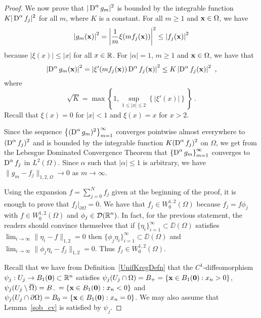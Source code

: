 \begin{proof}
We now prove that $\displaystyle |\operatorname{D}^\alpha g_m|^2$ is bounded by
the integrable function $\displaystyle K |\operatorname{D}^\alpha f_j|^2$ for all
$m$, where $K$ is a constant.  For all $m \geq 1$ and
$\mathbf{x} \in \Omega$, we have
\[
\left| g_m(\mathbf{x}) \right|^2 =
\left| \frac{1}{m} \xi(mf_j(\mathbf{x})) \right|^2
\leq \left| f_j(\mathbf{x}) \right|^2
\]
because $|\xi(x)|\leq |x|$ for all $x \in \mathbb{R}$.  For $|\alpha|=1$,
$m \geq 1$ and $\mathbf{x}\in \Omega$, we have that
\[
\left| \operatorname{D}^\alpha g_m(\mathbf{x}) \right|^2 =
\left| \xi'(mf_j(\mathbf{x})) \operatorname{D}^\alpha f_j(\mathbf{x}) \right|^2
\leq K \left| \operatorname{D}^\alpha f_j(\mathbf{x}) \right|^2 \ ,
\]
where
\[
\sqrt{K} = \max \left\{ 1,
\sup_{1\leq |x|\leq 2} \left\{ |\xi'(x)| \right\} \right\} \ .
\]
Recall that $\xi(x) =0$ for $|x|<1$ and $\xi(x) = x$ for $x>2$.

Since the sequence
$\displaystyle \left\{ (\operatorname{D}^\alpha g_m)^2 \right\}_{m=1}^\infty$ converges
pointwise almost everywhere to $\displaystyle (\operatorname{D}^\alpha f_j)^2$
and is bounded by the integrable function
$\displaystyle K (\operatorname{D}^\alpha f_j)^2$ on $\Omega$, we get from
the Lebesgue Dominated Convergence Theorem that
$\displaystyle \left\{ \operatorname{D}^\alpha g_m \right\}_{m=1}^\infty$ converges
to $\displaystyle \operatorname{D}^\alpha f_j$ in $\displaystyle L^2(\Omega)$.
Since $\alpha$ such that $|\alpha|\leq 1$ is arbitrary, we have
$\|g_m - f_j\|_{1,2,\Omega} \rightarrow 0$ as $m\rightarrow \infty$.

\stage{$\mathbf{\Rightarrow}$}
Using the expansion
$\displaystyle f = \sum_{j=0}^N f_j$ given at the beginning of the proof, it
is enough to prove that $\displaystyle f_j \big|_{\partial \Omega} = 0$.
We have that 
$\displaystyle f_j \in W^{1,2}_0(\Omega)$ because $f_j = f \phi_j$ with
$\displaystyle f \in W^{1,2}_0(\Omega)$ and
$\displaystyle \phi_j \in \mathcal{D}(\mathbb{R}^n)$.  In fact, for the previous
statement, the readers should convince themselves that if
$\displaystyle \{ \eta_i \}_{i=1}^\infty \subset \DD(\Omega)$
satisfies $\displaystyle \lim_{i\rightarrow \infty} \|\eta_i -f \|_{1,2} = 0$
then
$\displaystyle \{ \phi_j \eta_i \}_{i=1}^\infty \subset \DD(\Omega)$
and
$\displaystyle \lim_{i\rightarrow \infty} \|\phi_j \eta_i -f_j \|_{1,2} = 0$.
Thus $\displaystyle f_j \in W^{1,2}_0(\Omega)$.

Recall that we have from Definition~\ref{UnifKregDefn} that
the $\displaystyle C^1$-diffeomorphism
$\psi_j : U_j \to B_1(\mathbf{0}) \subset \mathbb{R}^n$
satisfies $\psi_j(U_j\cap \Omega) = B_+
= \left\{ \mathbf{x}\in B_1(\mathbf{0}) : x_n>0 \right\}$,
$\psi_j(U_j \setminus \overline{\Omega}) = B_-
= \left\{ \mathbf{x}\in B_1(\mathbf{0}) : x_n<0 \right\}$
and $\psi_j(U_j\cap \partial \Omega) = B_0
= \left\{ \mathbf{x}\in B_1(\mathbf{0}) : x_n=0 \right\}$.
We may also assume that Lemma~\ref{sob_cv} is satisfied by $\psi_j$.


\end{proof}
